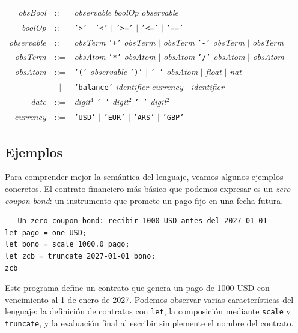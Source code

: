\documentclass[a4paper, 12pt]{article}
\begin{document}
\begin{center}
\begin{tabular}{r c l}
\textit{obsBool} & ::= & \textit{observable} \textit{boolOp} \textit{observable} \\
\textit{boolOp} & ::= & \texttt{'>'} $|$ \texttt{'<'} $|$ \texttt{'>='} $|$ \texttt{'<='} $|$ \texttt{'=='} \\[10pt]

\textit{observable} & ::= & \textit{obsTerm} \texttt{'+'} \textit{obsTerm} $|$ \textit{obsTerm} \texttt{'-'} \textit{obsTerm} $|$ \textit{obsTerm}\\
\textit{obsTerm} & ::= & \textit{obsAtom} \texttt{'*'} \textit{obsAtom} $|$ \textit{obsAtom} \texttt{'/'} \textit{obsAtom} $|$ \textit{obsAtom} \\
\textit{obsAtom} & ::= & \texttt{'('} \textit{observable} \texttt{')'} $|$ \texttt{'-'} \textit{obsAtom} $|$ \textit{float} $|$ \textit{nat} \\
    & $|$ & \texttt{'balance'} \textit{identifier} \textit{currency} $|$ \textit{identifier} \\[10pt]

\textit{date} & ::= & \textit{digit}$^4$ \texttt{'-'} \textit{digit}$^2$ \texttt{'-'} \textit{digit}$^2$ \\
\textit{currency} & ::= & \texttt{'USD'} $|$ \texttt{'EUR'} $|$ \texttt{'ARS'} $|$ \texttt{'GBP'} \\
\end{tabular}
\end{center}

\subsection{Ejemplos}

Para comprender mejor la semántica del lenguaje, veamos algunos ejemplos concretos. El contrato financiero más básico que podemos expresar es un \textit{zero-coupon bond}: un instrumento que promete un pago fijo en una fecha futura.

\begin{lstlisting}[style=finstyle, caption={Zero-coupon bond (basico.fin)}]
-- Un zero-coupon bond: recibir 1000 USD antes del 2027-01-01
let pago = one USD;
let bono = scale 1000.0 pago;
let zcb = truncate 2027-01-01 bono;
zcb
\end{lstlisting}

Este programa define un contrato que genera un pago de 1000 USD con vencimiento al 1 de enero de 2027. Podemos observar varias características del lenguaje: la definición de contratos con \texttt{let}, la composición mediante \texttt{scale} y \texttt{truncate}, y la evaluación final al escribir simplemente el nombre del contrato.
\end{document}
